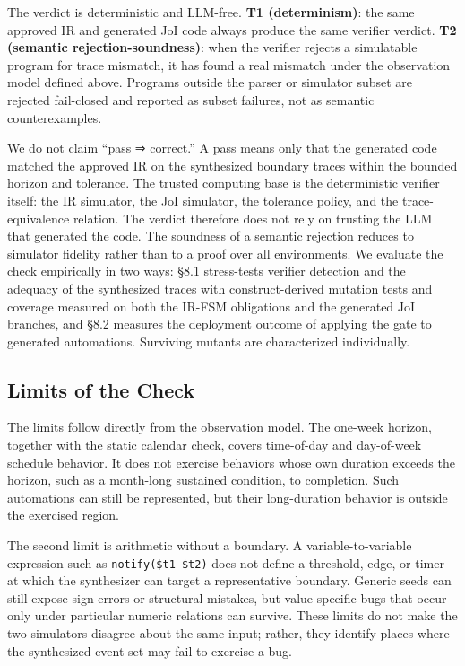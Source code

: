\documentclass[sigconf,nonacm,anonymous,review]{acmart}
\begin{document}
The verdict is deterministic and LLM-free. \textbf{T1 (determinism)}: the same approved IR and generated JoI code always produce the same verifier verdict. \textbf{T2 (semantic rejection-soundness)}: when the verifier rejects a simulatable program for trace mismatch, it has found a real mismatch under the observation model defined above. Programs outside the parser or simulator subset are rejected fail-closed and reported as subset failures, not as semantic counterexamples.

We do not claim ``pass ⇒ correct.'' A pass means only that the generated code matched the approved IR on the synthesized boundary traces within the bounded horizon and tolerance. The trusted computing base is the deterministic verifier itself: the IR simulator, the JoI simulator, the tolerance policy, and the trace-equivalence relation. The verdict therefore does not rely on trusting the LLM that generated the code. The soundness of a semantic rejection reduces to simulator fidelity rather than to a proof over all environments. We evaluate the check empirically in two ways: \S8.1 stress-tests verifier detection and the adequacy of the synthesized traces with construct-derived mutation tests and coverage measured on both the IR-FSM obligations and the generated JoI branches, and \S8.2 measures the deployment outcome of applying the gate to generated automations. Surviving mutants are characterized individually.

\subsection{Limits of the Check}

The limits follow directly from the observation model. The one-week horizon, together with the static calendar check, covers time-of-day and day-of-week schedule behavior. It does not exercise behaviors whose own duration exceeds the horizon, such as a month-long sustained condition, to completion. Such automations can still be represented, but their long-duration behavior is outside the exercised region.

The second limit is arithmetic without a boundary. A variable-to-variable expression such as \texttt{notify(\$t1-\$t2)} does not define a threshold, edge, or timer at which the synthesizer can target a representative boundary. Generic seeds can still expose sign errors or structural mistakes, but value-specific bugs that occur only under particular numeric relations can survive. These limits do not make the two simulators disagree about the same input; rather, they identify places where the synthesized event set may fail to exercise a bug.
\end{document}
